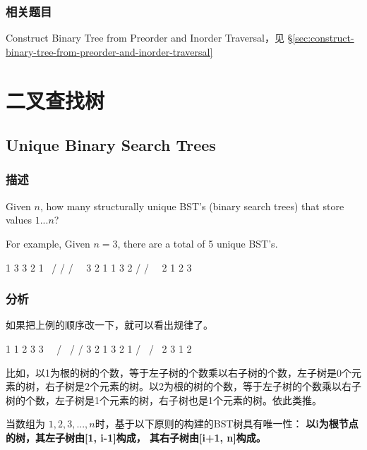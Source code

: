 \subsubsection{相关题目}
\begindot
\item Construct Binary Tree from Preorder and Inorder Traversal，见 \S \ref{sec:construct-binary-tree-from-preorder-and-inorder-traversal}
\myenddot


\section{二叉查找树} %


\subsection{Unique Binary Search Trees}
\label{sec:unique-binary-search-trees}


\subsubsection{描述}
Given $n$, how many structurally unique BST's (binary search trees) that store values $1...n$?

For example,
Given $n = 3$, there are a total of 5 unique BST's.
\begin{Code}
   1         3     3      2      1
    \       /     /      / \      \
     3     2     1      1   3      2
    /     /       \                 \
   2     1         2                 3
\end{Code}

\subsubsection{分析}
如果把上例的顺序改一下，就可以看出规律了。
\begin{Code}
 1       1           2          3       3
  \       \         / \        /       / 
   3       2       1   3      2       1
  /         \                /         \
2            3              1           2
\end{Code}

比如，以1为根的树的个数，等于左子树的个数乘以右子树的个数，左子树是0个元素的树，右子树是2个元素的树。以2为根的树的个数，等于左子树的个数乘以右子树的个数，左子树是1个元素的树，右子树也是1个元素的树。依此类推。

当数组为 $1,2,3,...,n$时，基于以下原则的构建的BST树具有唯一性：
\textbf{以i为根节点的树，其左子树由[1, i-1]构成， 其右子树由[i+1, n]构成。}

